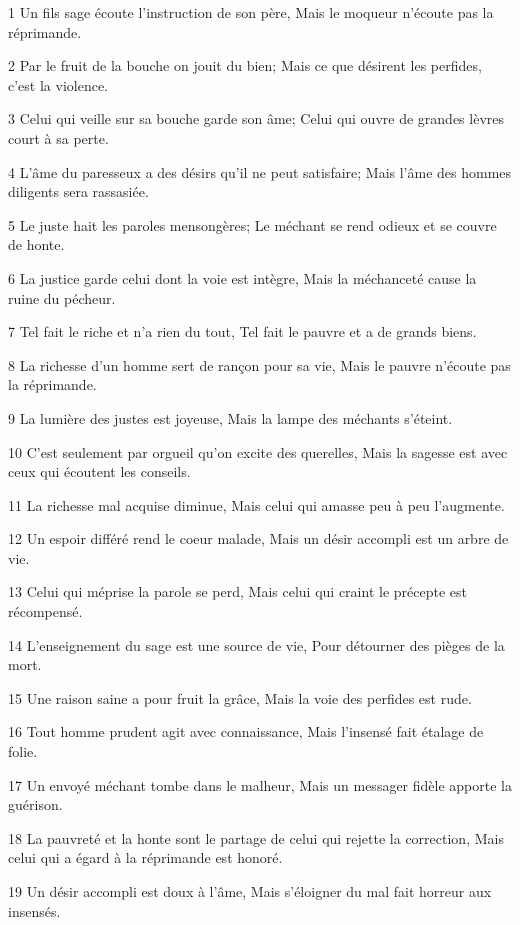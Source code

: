 \par 1 Un fils sage écoute l'instruction de son père, Mais le moqueur n'écoute pas la réprimande.
\par 2 Par le fruit de la bouche on jouit du bien; Mais ce que désirent les perfides, c'est la violence.
\par 3 Celui qui veille sur sa bouche garde son âme; Celui qui ouvre de grandes lèvres court à sa perte.
\par 4 L'âme du paresseux a des désirs qu'il ne peut satisfaire; Mais l'âme des hommes diligents sera rassasiée.
\par 5 Le juste hait les paroles mensongères; Le méchant se rend odieux et se couvre de honte.
\par 6 La justice garde celui dont la voie est intègre, Mais la méchanceté cause la ruine du pécheur.
\par 7 Tel fait le riche et n'a rien du tout, Tel fait le pauvre et a de grands biens.
\par 8 La richesse d'un homme sert de rançon pour sa vie, Mais le pauvre n'écoute pas la réprimande.
\par 9 La lumière des justes est joyeuse, Mais la lampe des méchants s'éteint.
\par 10 C'est seulement par orgueil qu'on excite des querelles, Mais la sagesse est avec ceux qui écoutent les conseils.
\par 11 La richesse mal acquise diminue, Mais celui qui amasse peu à peu l'augmente.
\par 12 Un espoir différé rend le coeur malade, Mais un désir accompli est un arbre de vie.
\par 13 Celui qui méprise la parole se perd, Mais celui qui craint le précepte est récompensé.
\par 14 L'enseignement du sage est une source de vie, Pour détourner des pièges de la mort.
\par 15 Une raison saine a pour fruit la grâce, Mais la voie des perfides est rude.
\par 16 Tout homme prudent agit avec connaissance, Mais l'insensé fait étalage de folie.
\par 17 Un envoyé méchant tombe dans le malheur, Mais un messager fidèle apporte la guérison.
\par 18 La pauvreté et la honte sont le partage de celui qui rejette la correction, Mais celui qui a égard à la réprimande est honoré.
\par 19 Un désir accompli est doux à l'âme, Mais s'éloigner du mal fait horreur aux insensés.
